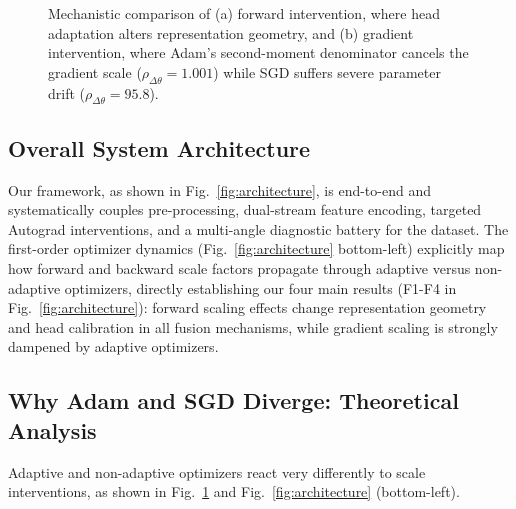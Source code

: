 \documentclass[conference]{IEEEtran}
\begin{document}
\begin{figure}[!t]
{}
\caption{Mechanistic comparison of (a) forward intervention, where head adaptation alters representation geometry, and (b) gradient intervention, where Adam's second-moment denominator cancels the gradient scale ($\rho_{\Delta\theta} = 1.001$) while SGD suffers severe parameter drift ($\rho_{\Delta\theta} = 95.8$).}
\label{fig:forward_vs_gradient}
\end{figure}

\subsection{Overall System Architecture}
Our framework, as shown in Fig.~\ref{fig:architecture}, is end-to-end and systematically couples pre-processing, dual-stream feature encoding, targeted Autograd interventions, and a multi-angle diagnostic battery for the dataset. The first-order optimizer dynamics (Fig.~\ref{fig:architecture} bottom-left) explicitly map how forward and backward scale factors propagate through adaptive versus non-adaptive optimizers, directly establishing our four main results (F1-F4 in Fig.~\ref{fig:architecture}): forward scaling effects change representation geometry and head calibration in all fusion mechanisms, while gradient scaling is strongly dampened by adaptive optimizers.

\subsection{Why Adam and SGD Diverge: Theoretical Analysis}
Adaptive and non-adaptive optimizers react very differently to scale interventions, as shown in Fig.~\ref{fig:forward_vs_gradient} and Fig.~\ref{fig:architecture} (bottom-left).
\end{document}
